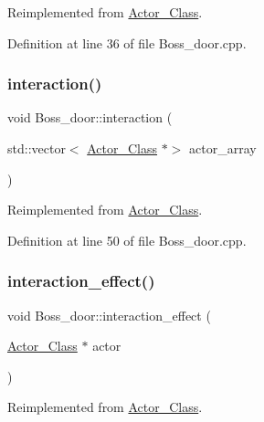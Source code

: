 Reimplemented from \hyperlink{class_actor___class_ac49cd62be76b4b950ecbe155413f1b64}{Actor\+\_\+\+Class}.



Definition at line 36 of file Boss\+\_\+door.\+cpp.

\hypertarget{class_boss__door_ab80f398f1c479f78c2b36409c311ccb5}{}\label{class_boss__door_ab80f398f1c479f78c2b36409c311ccb5} 
\subsubsection{\texorpdfstring{interaction()}{interaction()}}
{\footnotesize\ttfamily void Boss\+\_\+door\+::interaction (\begin{DoxyParamCaption}\item[{std\+::vector$<$ \hyperlink{class_actor___class}{Actor\+\_\+\+Class} $\ast$$>$}]{actor\+\_\+array }\end{DoxyParamCaption})\hspace{0.3cm}{\ttfamily [virtual]}}



Reimplemented from \hyperlink{class_actor___class_a87d1e079d8576fa99592a60b38a04a1b}{Actor\+\_\+\+Class}.



Definition at line 50 of file Boss\+\_\+door.\+cpp.

\hypertarget{class_boss__door_ab47df13fb29b88a5be09fb7062384a50}{}\label{class_boss__door_ab47df13fb29b88a5be09fb7062384a50} 
\subsubsection{\texorpdfstring{interaction\+\_\+effect()}{interaction\_effect()}}
{\footnotesize\ttfamily void Boss\+\_\+door\+::interaction\+\_\+effect (\begin{DoxyParamCaption}\item[{\hyperlink{class_actor___class}{Actor\+\_\+\+Class} $\ast$}]{actor }\end{DoxyParamCaption})\hspace{0.3cm}{\ttfamily [virtual]}}



Reimplemented from \hyperlink{class_actor___class_af3488ca470eb77255060142fd167aa72}{Actor\+\_\+\+Class}.



